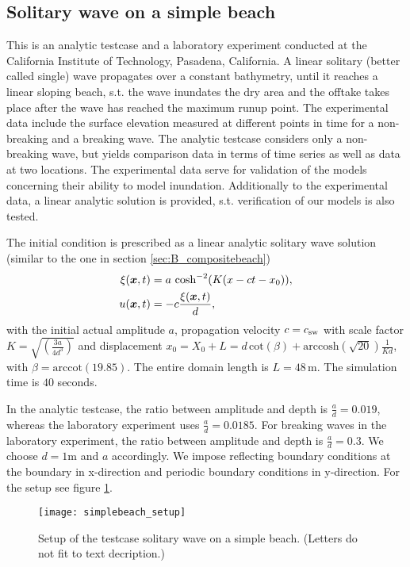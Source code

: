 \subsection{Solitary wave on a simple beach}
This is an analytic testcase and a laboratory experiment conducted at the California Institute of Technology, Pasadena, California. A linear solitary (better called single) wave propagates over a  constant bathymetry, until it reaches a linear sloping beach, s.t. the wave inundates the dry area and the offtake takes place after the wave has reached the maximum runup point. 
The experimental data include the surface elevation measured at different points in time for a non-breaking and a breaking wave. The analytic testcase considers only a non-breaking wave, but yields comparison data in terms of time series as well as data at two locations.
The experimental data serve for validation of the models concerning their ability to model inundation. Additionally to the experimental data, a linear analytic solution is provided, s.t. verification of our models is also tested.

The initial condition is prescribed as a linear analytic solitary wave solution (similar to the one in section \ref{sec:B_compositebeach})
\begin{align}
\xi(\boldsymbol{x},t)&=a \ \text{cosh}^{-2}(K(x-ct-x_0)), \\
u(\boldsymbol{x},t)&=-c\frac{\xi(\boldsymbol{x},t)}{d},
\end{align}
with the initial actual amplitude $a$, propagation velocity $c=c_{\text{sw}}$ with scale factor $K=\sqrt{\left(\frac{3a}{4d^3}\right)}$ and displacement $x_0=X_0+L=d \, \text{cot}(\beta)+\text{arccosh}(\sqrt{20})\frac{1}{Kd}$, with $\beta=\text{arccot}(19.85)$. The entire domain length is $L=48 \, \text{m}$. The simulation time is $40$ seconds. 

In the analytic testcase, the ratio between amplitude and depth is $\frac{a}{d}=0.019$, whereas the laboratory experiment uses  $\frac{a}{d}=0.0185$. 
For breaking waves in the laboratory experiment, the ratio between amplitude and depth is $\frac{a}{d}=0.3$. We choose $d=1$m and $a$ accordingly.
We impose reflecting boundary conditions at the boundary in x-direction and periodic boundary conditions in y-direction. For the setup see figure \ref{fig:simplebeach_setup}. 

\begin{figure}[htbp]
\texttt{[image: simplebeach\_setup]}
\caption{Setup of the testcase solitary wave on a simple beach. (Letters do not fit to text decription.)}
\label{fig:simplebeach_setup}
\end{figure}

